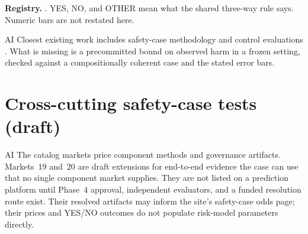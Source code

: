 \begin{predictionresolution}
\textbf{Registry.} . YES, NO, and OTHER mean what the shared three-way rule says. Numeric bars are not restated here.
\end{predictionresolution}
\begin{authbar}{AI}
Closest existing work includes safety-case methodology and control evaluations \autocite{greenblatt2024aicontrol}.
What is missing is a precommitted bound on observed harm in a frozen setting, checked against a compositionally coherent case and the stated error bars.
\end{authbar}
\authbarneedspace

\section{Cross-cutting safety-case tests (draft)}
\label{sec:appp-cross-cutting}
\begin{authbar}{AI}
The catalog markets price component methods and governance artifacts.
Markets~19 and~20 are draft extensions for end-to-end evidence the case can use that no single component market supplies.
They are not listed on a prediction platform until Phase~4 approval, independent evaluators, and a funded resolution route exist.
Their resolved artifacts may inform the site's safety-case odds page; their prices and YES/NO outcomes do not populate risk-model parameters directly.

\end{authbar}
\authbarneedspace


